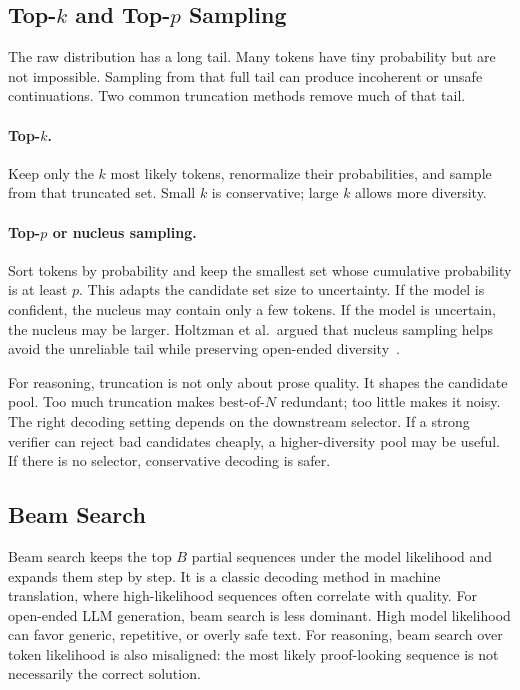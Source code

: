 \subsection[Top-k and Top-p Sampling]{Top-$k$ and Top-$p$ Sampling}

The raw distribution has a long tail. Many tokens have tiny probability but are not impossible. Sampling from that full tail can produce incoherent or unsafe continuations. Two common truncation methods remove much of that tail.

\paragraph{Top-$k$.} Keep only the $k$ most likely tokens, renormalize their probabilities, and sample from that truncated set. Small $k$ is conservative; large $k$ allows more diversity.

\paragraph{Top-$p$ or nucleus sampling.} Sort tokens by probability and keep the smallest set whose cumulative probability is at least $p$. This adapts the candidate set size to uncertainty. If the model is confident, the nucleus may contain only a few tokens. If the model is uncertain, the nucleus may be larger. Holtzman et al.\ argued that nucleus sampling helps avoid the unreliable tail while preserving open-ended diversity~\cite{holtzman2020curious}.

For reasoning, truncation is not only about prose quality. It shapes the candidate pool. Too much truncation makes best-of-$N$ redundant; too little makes it noisy. The right decoding setting depends on the downstream selector. If a strong verifier can reject bad candidates cheaply, a higher-diversity pool may be useful. If there is no selector, conservative decoding is safer.

\subsection{Beam Search}

Beam search keeps the top $B$ partial sequences under the model likelihood and expands them step by step. It is a classic decoding method in machine translation, where high-likelihood sequences often correlate with quality. For open-ended LLM generation, beam search is less dominant. High model likelihood can favor generic, repetitive, or overly safe text. For reasoning, beam search over token likelihood is also misaligned: the most likely proof-looking sequence is not necessarily the correct solution.

